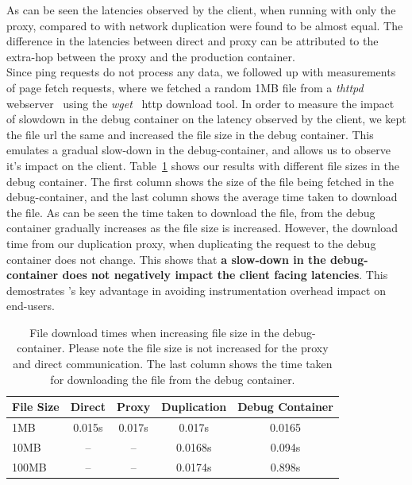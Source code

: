As can be seen the latencies observed by the client, when running with only the proxy, compared to with network duplication were found to be almost equal. 
The difference in the latencies between direct and proxy can be attributed to the extra-hop between the proxy and the production container. \\


Since ping requests do not process any data,
we followed up with measurements of page fetch requests, where we fetched a random 1MB file from a \emph{thttpd} webserver~\cite{thttpd} using the \emph{wget}~\cite{wget} http download tool.
In order to measure the impact of slowdown in the debug container on the latency observed by the client, 
we kept the file url the same and increased the file size in the debug container. 
This emulates a gradual slow-down in the debug-container, and allows us to observe it's impact on the client.
Table~\ref{tab:increasedSize} shows our results with different file sizes in the debug container.
The first column shows the size of the file being fetched in the debug-container, and the last column shows the average time taken to download the file.
As can be seen the time taken to download the file, from the debug container gradually increases as the file size is increased.
However, the download time from our duplication proxy, when duplicating the request to the debug container does not change.
This shows that \textbf{a slow-down in the debug-container does not negatively impact the client facing latencies}.
This demostrates \parikshan's key advantage in avoiding instrumentation overhead impact on end-users.  

\begin{table}
\centering
\begin{center}
	\begin{tabular}{l c c c c}
	\toprule
	\textbf{File Size} & \textbf{Direct} & \textbf{Proxy} & \textbf{Duplication} & \textbf{Debug Container} \\
	\midrule
	1MB & 0.015s & 0.017s & 0.017s & 0.0165 \\
	10MB & -- & -- & 0.0168s & 0.094s\\
	100MB & -- & -- & 0.0174s & 0.898s\\
	\bottomrule
	\end{tabular}
\end{center}
\caption{File download times when increasing file size in the debug-container. Please note the file size is not increased for the proxy and direct communication. The last column shows the time taken for downloading the file from the debug container.}
\label{tab:increasedSize}
\end{table}
 


